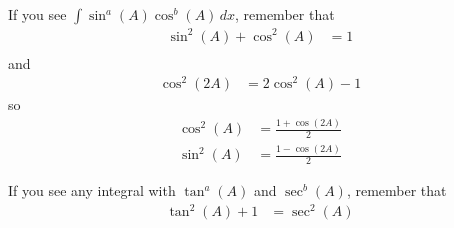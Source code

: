 \documentclass{article}
\begin{document}
If you see $\int \sin^a(A)\cos^b(A) \, dx$, remember that
\begin{align*}
    \sin^2(A) + \cos^2(A) &= 1\\
\end{align*}
and
\begin{align*}
    \cos^2(2A) &= 2\cos^2(A) -1
\end{align*}
so
\begin{align*}
    \cos^2(A) &= \frac{1+\cos(2A)}{2} \\
    \sin^2(A) &= \frac{1-\cos(2A)}{2}
\end{align*}

If you see any integral with $\tan^a(A)$ and $\sec^b(A)$, remember that
\begin{align*}
    \tan^2(A) + 1 &= \sec^2(A)\\
\end{align*}
\end{document}
